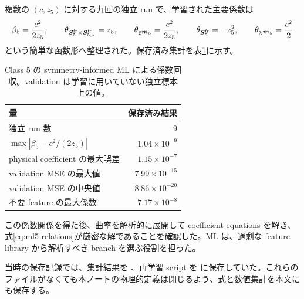 複数の $(c,z_5)$ に対する九回の独立 run で、学習された主要係数は
\begin{equation}
\beta_5=\frac{c^2}{2z_5},
\qquad
\theta_{\boldsymbol S_5^{\rm fr}\times\boldsymbol S_{5,x}^{\rm fr}}=z_5,
\qquad
\theta_{\varrho\boldsymbol m_5}=\frac{c^2}{2z_5},
\qquad
\theta_{\boldsymbol S_5^{\rm fr}}=-z_5^2,
\qquad
\theta_{\chi\boldsymbol m_5}=\frac{c^2}{2}
\label{eq:ml5-relations}
\end{equation}
という簡単な函数形へ整理された。保存済み集計を表\ref{tab:ml5-summary}に示す。
\begin{table}[htbp]
\centering
\caption{Class 5 の symmetry-informed ML による係数回収。validation は学習に用いていない独立標本上の値。}
\label{tab:ml5-summary}
\begin{tabular}{lr}
\toprule
量 & 保存済み結果\\
\midrule
独立 run 数 & 9\\
$\max|\beta_5-c^2/(2z_5)|$ & $1.04\times10^{-9}$\\
physical coefficient の最大誤差 & $1.15\times10^{-7}$\\
validation MSE の最大値 & $7.99\times10^{-15}$\\
validation MSE の中央値 & $8.86\times10^{-20}$\\
不要 feature の最大係数 & $7.17\times10^{-8}$\\
\bottomrule
\end{tabular}
\end{table}

この係数関係を得た後、曲率を解析的に展開して coefficient equations を解き、式\eqref{eq:ml5-relations}が厳密な解であることを確認した。ML は、過剰な feature library から解析すべき branch を選ぶ役割を担った。

当時の保存記録では、集計結果を 、再学習 script を  に保存していた。これらのファイルがなくても本ノートの物理的定義は閉じるよう、式と数値集計を本文にも保存する。

